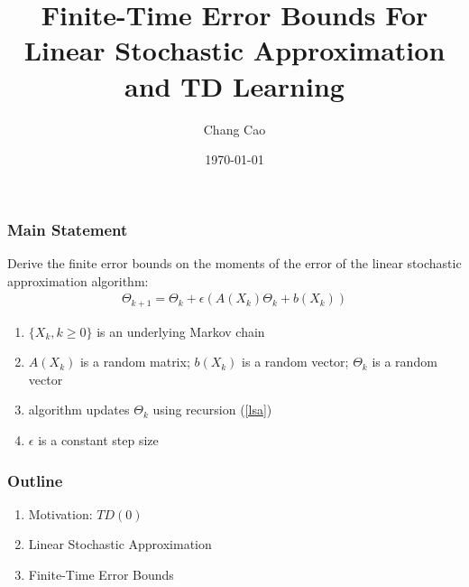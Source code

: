 \documentclass[t,10pt]{beamer}
\theoremstyle{remark}
\begin{document}
\title{Finite-Time Error Bounds For Linear Stochastic Approximation and TD Learning}
\author{Chang Cao}
\date{\today}

\begin{frame}
\titlepage
\end{frame}






\begin{frame}


\frametitle{ Main Statement}
Derive the finite error bounds on the moments of the error of the linear stochastic approximation algorithm:
\begin{align} \label{lsa}
\Theta_{k+1} = \Theta_k + \epsilon(A(X_k) \Theta_k + b(X_k))
\end{align} 
\begin{enumerate}
\item $\{X_k, k \geq 0\}$ is an underlying Markov chain
\item $A(X_k)$ is a random matrix; $b(X_k)$ is a random vector; $\Theta_k$ is a random vector
\item algorithm updates $\Theta_k$ using recursion (\ref{lsa})
\item $\epsilon$ is a constant step size
\end{enumerate}

\end{frame}



\begin{frame}


\frametitle{Outline}
\begin{enumerate}
\item Motivation: $TD(0)$
\item Linear Stochastic Approximation
\item Finite-Time Error Bounds
\end{enumerate}



\end{frame}
\end{document}
